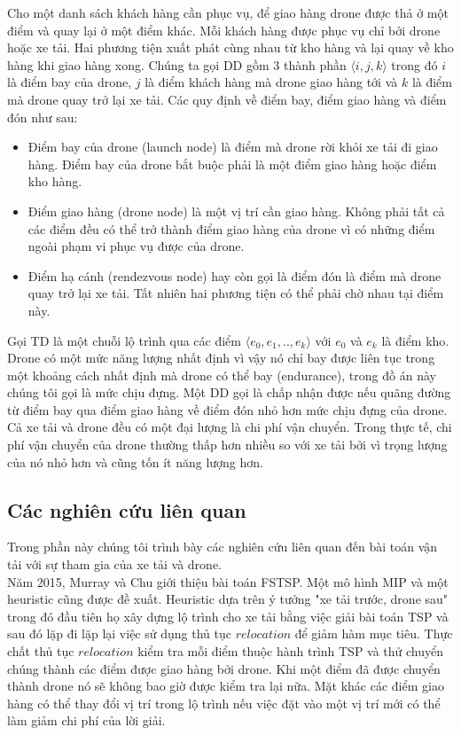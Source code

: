 \documentclass[a4paper,12pt]{report}
\begin{document}
Cho một danh sách khách hàng cần phục vụ, để giao hàng drone được thả ở một điểm và quay lại ở một điểm khác. Mỗi khách hàng được phục vụ chỉ bởi drone hoặc xe tải. Hai phương tiện xuất phát cùng nhau từ kho hàng và lại quay về kho hàng khi giao hàng xong. Chúng ta gọi \ac{DD} gồm 3 thành phần $\langle i,j,k \rangle$ trong đó $i$ là điểm bay của drone, $j$ là điểm khách hàng mà drone giao hàng tới và $k$ là điểm mà drone quay trở lại xe tải. Các quy định về điểm bay, điểm giao hàng và điểm đón như sau:
\begin{itemize}
\item Điểm bay của drone (launch node) là điểm mà drone rời khỏi xe tải đi giao hàng. Điểm bay của drone bắt buộc phải là một điểm giao hàng hoặc điểm kho hàng. 
\item Điểm giao hàng (drone node) là một vị trí cần giao hàng. Không phải tất cả các điểm đều có thể trở thành điểm giao hàng của drone vì có những điểm ngoài phạm vi phục vụ được của drone.
\item Điểm hạ cánh (rendezvous node) hay còn gọi là điểm đón là điểm mà drone quay trở lại xe tải. Tất nhiên hai phương tiện có thể phải chờ nhau tại điểm này.
\end{itemize}
Gọi  \ac{TD} là một chuỗi lộ trình qua các điểm $\langle e_0,e_1,..,e_k \rangle $ với $e_0$ và $e_k$ là điểm kho.
Drone có một mức năng lượng nhất định vì vậy nó chỉ bay được liên tục trong một khoảng cách nhất định mà drone có thể bay (endurance), trong đồ án này chúng tôi gọi là mức chịu đựng. Một \ac{DD} gọi là chấp nhận được nếu quãng đường từ điểm bay qua điểm giao hàng về điểm đón nhỏ hơn mức chịu đựng của drone. Cả xe tải và drone đều có một đại lượng là chi phí vận chuyển. Trong thực tế, chi phí vận chuyển của drone thường thấp hơn nhiều so với xe tải bởi vì trọng lượng của nó nhỏ hơn và cũng tốn ít năng lượng hơn.


\subsection{Các nghiên cứu liên quan}
Trong phần này chúng tôi trình bày các nghiên cứu liên quan đến bài toán vận tải với sự tham gia của xe tải và drone.\\

Năm 2015, Murray và Chu \cite{12} giới thiệu bài toán \ac{FSTSP}. Một mô hình \ac{MIP} và một heuristic cũng được đề xuất. Heuristic dựa trên ý tưởng "xe tải trước, drone sau" trong đó đầu tiên họ xây dựng lộ trình cho xe tải bằng việc giải bài toán \ac{TSP} và sau đó lặp đi lặp lại việc sử dụng thủ tục $relocation$ để giảm hàm mục tiêu. Thực chất thủ tục $relocation$ kiểm tra mỗi điểm thuộc hành trình TSP và thử chuyển chúng thành các điểm được giao hàng bởi drone. Khi một điểm đã được chuyển thành drone nó sẽ không bao giờ được kiểm tra lại nữa. Mặt khác các điểm giao hàng có thể thay đổi vị trí trong lộ trình nếu việc đặt vào một vị trí mới có thể làm giảm chi phí của lời giải. \\
\end{document}
